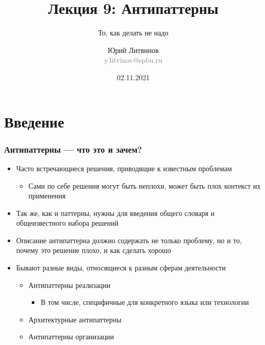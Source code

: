 \documentclass[xetex,mathserif,serif]{beamer}
\title{Лекция 9: Антипаттерны}
\subtitle{То, как делать не надо}
\author[Юрий Литвинов]{Юрий Литвинов\\\small{\textcolor{gray}{y.litvinov@spbu.ru}}}
\date{02.11.2021}
\begin{document}
    
    \frame{\titlepage}

    \section{Введение}

    \begin{frame}
        \frametitle{Антипаттерны --- что это и зачем?}
        \begin{itemize}
            \item Часто встречающиеся решения, приводящие к известным проблемам
            \begin{itemize}
                \item Сами по себе решения могут быть неплохи, может быть плох контекст их применения
            \end{itemize}
            \item Так же, как и паттерны, нужны для введения общего словаря и общеизвестного набора решений
            \item Описание антипаттерна должно содержать не только проблему, но и то, почему это решение плохо, и как сделать хорошо
            \item Бывают разные виды, относящиеся к разным сферам деятельности
            \begin{itemize}
                \item Антипаттерны реализации
                \begin{itemize}
                    \item В том числе, специфичные для конкретного языка или технологии
                \end{itemize}
                \item Архитектурные антипаттерны
                \item Антипаттерны организации
            \end{itemize}
        \end{itemize}
    \end{frame}
\end{document}
